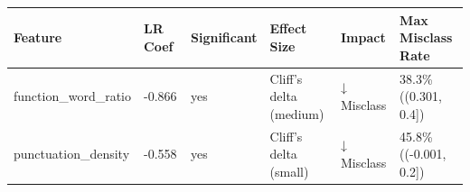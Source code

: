 \begin{tabular}{llllll}
\toprule
Feature & LR Coef & Significant & Effect Size & Impact & Max Misclass Rate \\
\midrule
function\_word\_ratio & -0.866 & yes & Cliff's delta (medium) & ↓ Misclass & 38.3\% ((0.301, 0.4]) \\
punctuation\_density & -0.558 & yes & Cliff's delta (small) & ↓ Misclass & 45.8\% ((-0.001, 0.2]) \\
\bottomrule
\end{tabular}
